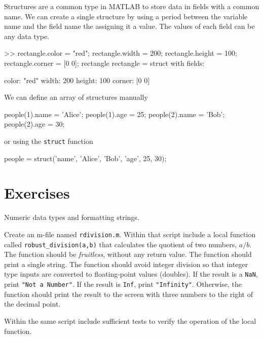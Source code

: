 Structures are a common type in MATLAB to store data in fields with a common name. We can create a single structure by using a period between the variable name and the field name the assigning it a value.  The values of each field can be any data type.
\begin{code}
>> rectangle.color = "red";
rectangle.width = 200;
rectangle.height = 100;
rectangle.corner = [0 0];
rectangle
rectangle = 
  struct with fields:

     color: "red"
     width: 200
    height: 100
    corner: [0 0]
\end{code}

We can define an array of structures manually
\begin{code}
    people(1).name = 'Alice';
    people(1).age = 25;
    people(2).name = 'Bob';
    people(2).age = 30;
\end{code}

or using the \lstinline{struct} function
\begin{code}
people = struct('name', {'Alice', 'Bob'}, 'age', {25, 30});
\end{code}


\section{Exercises}

\begin{ex}
    Numeric data types and formatting strings.

    Create an m-file named \lstinline{rdivision.m}.  Within that script include a local function called \lstinline{robust_division(a,b)} that calculates the quotient of two numbers, $a/b$. The function should be \emph{fruitless}, without any return value.  The function should print a single string. The function should avoid integer division so that integer type inputs are converted to floating-point values (doubles).  If the result is a \lstinline{NaN}, print \lstinline{"Not a Number"}.  If the result is \lstinline{Inf}, print \lstinline{"Infinity"}. Otherwise, the function should print the result to the screen with three numbers to the right of the decimal point.
    
    Within the same script include sufficient tests to verify the operation of the local function.  
\end{ex}



